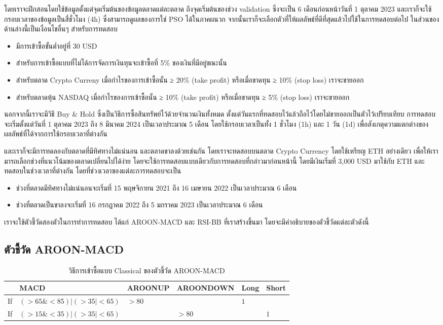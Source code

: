โดยเราจะฝึกสอนโดยใช้ข้อมูลตั้งแต่จุดเริ่มต้นของข้อมูลตลาดแต่ละตลาด ถึงจุดเริ่มต้นของช่วง validation ซึ่งจะเป็น 6 เดือนก่อนหน้าวันที่ 1 ตุลาคม 2023 และเราก็จะใช้กรอบเวลาของข้อมูลเป็นสี่ชั่วโมง (4h) ซึ่งสามารถดูผลของการใช่ PSO ได้ในภาคผนวก จากนั้นเราก็จะเลือกตัวที่ให้ผลลัพธ์ที่ดีที่สุดแล้วไปใช้ในการทดสอบต่อไป ในส่วนของด้านล่างนี้เป็นเงื่อนไขอื่นๆ สำหรับการทดสอบ
\begin{itemize}
    \item {มีการเข้าซื้อขั้นต่ำอยู่ที่ 30 USD}
    \item {สำหรับการเข้าซื้อแบบที่ไม่ได้การจัดการเงินทุนจะเข้าซื้อที่ 5\% ของเงินที่มีอยู่ขณะนั้น}
    \item {สำหรับตลาด Crypto Curreny เมื่อกำไรของการเข้าซื้อนั้น ≥ 20\% (take profit) หรือเมื่อขาดทุน ≥ 10\% (stop loss) เราจะขายออก}
    \item {สำหรับตลาดหุ้น NASDAQ เมื่อกำไรของการเข้าซื้อนั้น ≥ 10\% (take profit) หรือเมื่อขาดทุน ≥ 5\% (stop loss) เราจะขายออก}
\end{itemize}
นอกจากนี้เราจะมีวิธี Buy \& Hold ซึ่งเป็นวิธีการซื้อสินทรัพย์ไว้ด้วยจำนวนเงินทั้งหมด ตั้งแต่วันแรกที่ทดสอบไว้แล้วถือไว้โดยไม่ขายออกเป็นตัวไว้เปรียบเทียบ การทดสอบจะเริ่มตั้งแต่วันที่ 1 ตุลาคม 2023 ถึง 8 มีนาคม 2024 เป็นเวลาประมาณ 5 เดือน โดยใช้กรอบเวลาเป็นทั้ง 1 ชั่วโมง (1h) และ 1 วัน (1d) เพื่อสังเกตุความแตกต่างของผลลัพธ์ที่ได้จากการใช้กรอบเวลาที่ต่างกัน 

และเราก็จะมีการทดลองกับตลาดที่มีทิศทางไม่แน่นอน และตลาดขาลงด้วยเช่นกัน โดยเราจะทดสอบบนตลาด Crypto Currency โดยใช้เหรียญ ETH อย่างเดียว เพื่อให้เรามารถเลือกช่วงที่แนวโน้มของตลาดเปลี่ยนไปได้ง่าย โดยจะใช้การทดสอบแบบเดียวกับการทดสอบที่กล่าวมาก่อนหน้านี้ โดยมีเงินเริ่มที่ 3,000 USD มาใช้กับ ETH และทดสอบในช่วงเวลาที่ต่างกัน โดยที่ช่วงเวลาของแต่ละการทดสอบจะเป็น
\begin{itemize}
    \item ช่วงที่ตลาดมีทิศทางไม่แน่นอนจะเริ่มที่ 15 พฤษจิกายน 2021 ถึง 16 เมษายน 2022 เป็นเวลาประมาณ 6 เดือน
    \item ช่วงที่ตลาดเป็นขาลงจะเริ่มที่ 16 กรกฎาคม 2022 ถึง 5 มกราคม 2023 เป็นเวลาประมาณ 6 เดือน
\end{itemize}
เราจะใช้ตัวชี้วัดสองตัวในการทำการทดสอบ ได้แก่ AROON-MACD และ RSI-BB ที่เราสร้างขึ้นมา โดยจะมีคำอธิบายของตัวชี้วัดแต่ละตัวดังนี้

\subsection{ตัวชี้วัด AROON-MACD}
\begin{table}[ht]
    \centering
    \begin{tabular}{llllll}
        \hline
           & MACD                          & AROONUP & AROONDOWN & Long & Short \\ \hline
        If & $(>65 \& <85) | (>35 | < 65)$ & $>80$   &           & $1$  &       \\ \hline
        If & $(>15 \& <35) | (>35 | < 65)$ &         & $>80$     &      & $1$   \\ \hline
    \end{tabular}
    \caption{วิธีการเข้าซื้อแบบ Classical ของตัวชี้วัด AROON-MACD}
\end{table}

